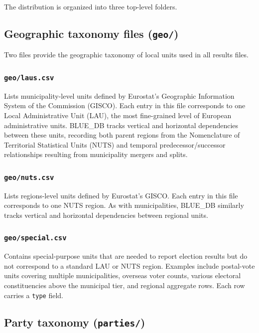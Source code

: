 The distribution is organized into three top-level folders.

\subsection{Geographic taxonomy files (\texttt{geo/})}

Two files provide the geographic taxonomy of local units used in all results files.

\subsubsection{\texttt{geo/laus.csv}}

Lists municipality-level units defined by Eurostat's
Geographic Information System of the Commission (GISCO).
Each entry in this file corresponds to one Local Administrative Unit (LAU),
the most fine-grained level of European
administrative units. BLUE\_DB tracks vertical and horizontal dependencies between
these units, recording both parent regions from the
Nomenclature of Territorial Statistical Units (NUTS)
and temporal predecessor/successor relationships resulting from municipality
mergers and splits.

\subsubsection{\texttt{geo/nuts.csv}}

Lists regions-level units defined by Eurostat's GISCO.
Each entry in this file corresponds to one NUTS region.
As with municipalities, BLUE\_DB similarly tracks vertical and horizontal dependencies
between regional units.

\subsubsection{\texttt{geo/special.csv}}

Contains special-purpose units that are needed to report election results
but do not correspond to a standard LAU or NUTS region. Examples include postal-vote
units covering multiple municipalities, overseas voter counts,
various electoral constituencies above the municipal tier, and regional
aggregate rows. Each row carries a \texttt{type} field.

\subsection{Party taxonomy (\texttt{parties/})}

